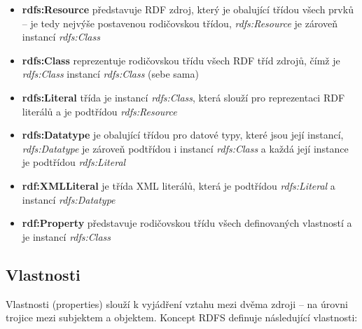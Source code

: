 \documentclass{projekt}
\begin{document}
\begin {itemize}

\item \textbf{rdfs:Resource} představuje RDF zdroj, který je obalující třídou všech prvků – je tedy nejvýše postavenou rodičovskou třídou, {\it rdfs:Resource} je zároveň instancí {\it rdfs:Class}
\item \textbf{rdfs:Class} reprezentuje rodičovskou třídu všech RDF tříd zdrojů, čímž je {\it rdfs:Class} instancí {\it rdfs:Class} (sebe sama)
\item \textbf{rdfs:Literal} třída je instancí {\it rdfs:Class}, která slouží pro reprezentaci RDF literálů a je podtřídou {\it rdfs:Resource}
\item \textbf{rdfs:Datatype} je obalující třídou pro datové typy, které jsou její instancí, {\it rdfs:Datatype} je zároveň podtřídou i instancí {\it rdfs:Class} a každá její instance je podtřídou {\it rdfs:Literal}
\item \textbf{rdf:XMLLiteral} je třída XML literálů, která je podtřídou {\it rdfs:Literal} a instancí {\it rdfs:Datatype}
\item \textbf{rdf:Property} představuje rodičovskou třídu všech definovaných vlastností a je instancí {\it rdfs:Class}


\end{itemize}


\subsection{Vlastnosti}
\hspace{0.65cm}Vlastnosti (properties) slouží k vyjádření vztahu mezi dvěma zdroji – na úrovni trojice mezi subjektem a objektem. Koncept RDFS definuje následující vlastnosti:
\end{document}
